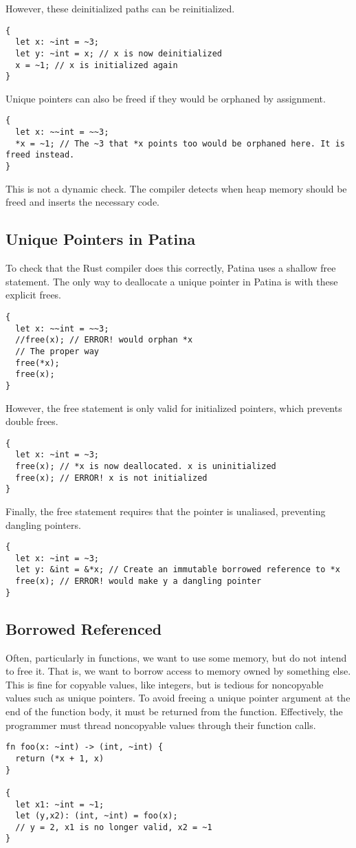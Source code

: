 However, these deinitialized paths can be reinitialized.
\begin{verbatim}
{
  let x: ~int = ~3;
  let y: ~int = x; // x is now deinitialized
  x = ~1; // x is initialized again
}
\end{verbatim}

Unique pointers can also be freed if they would be orphaned by assignment.
\begin{verbatim}
{
  let x: ~~int = ~~3;
  *x = ~1; // The ~3 that *x points too would be orphaned here. It is freed instead.
}
\end{verbatim}

This is not a dynamic check. 
The compiler detects when heap memory should be freed and inserts the necessary code.

\subsection*{Unique Pointers in Patina}
To check that the Rust compiler does this correctly, Patina uses a shallow free statement.
The only way to deallocate a unique pointer in Patina is with these explicit frees.
\begin{verbatim}
{
  let x: ~~int = ~~3;
  //free(x); // ERROR! would orphan *x
  // The proper way
  free(*x);
  free(x);
}
\end{verbatim}
However, the free statement is only valid for initialized pointers, which prevents double frees.
\begin{verbatim}
{
  let x: ~int = ~3;
  free(x); // *x is now deallocated. x is uninitialized
  free(x); // ERROR! x is not initialized
}
\end{verbatim}
Finally, the free statement requires that the pointer is unaliased, preventing dangling pointers.
\begin{verbatim}
{
  let x: ~int = ~3;
  let y: &int = &*x; // Create an immutable borrowed reference to *x
  free(x); // ERROR! would make y a dangling pointer
}
\end{verbatim}

\subsection*{Borrowed Referenced}
Often, particularly in functions, we want to use some memory, but do not intend to free it.
That is, we want to borrow access to memory owned by something else.
This is fine for copyable values, like integers, 
but is tedious for noncopyable values such as unique pointers.
To avoid freeing a unique pointer argument at the end of the function body,
it must be returned from the function.
Effectively, the programmer must thread noncopyable values through their function calls.
\begin{verbatim}
fn foo(x: ~int) -> (int, ~int) {
  return (*x + 1, x)
}

{
  let x1: ~int = ~1;
  let (y,x2): (int, ~int) = foo(x);
  // y = 2, x1 is no longer valid, x2 = ~1
}
\end{verbatim}

